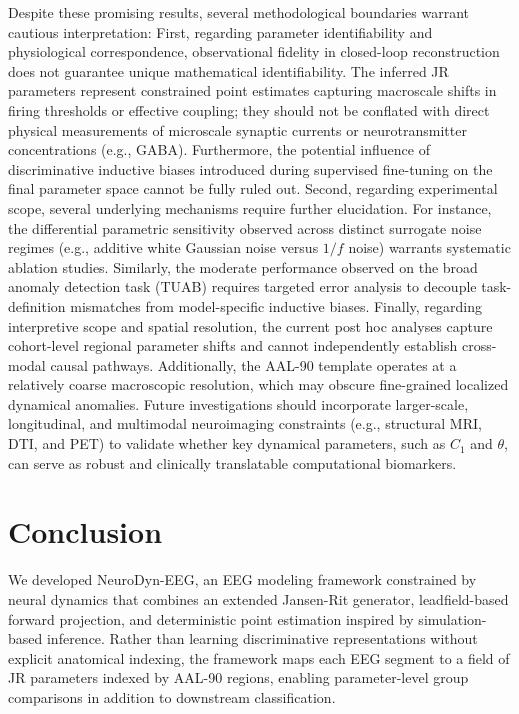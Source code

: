 \documentclass{article}
\begin{document}
{Despite these promising results, several methodological boundaries warrant cautious interpretation: First, regarding parameter identifiability and physiological correspondence, observational fidelity in closed-loop reconstruction does not guarantee unique mathematical identifiability. The inferred JR parameters represent constrained point estimates capturing macroscale shifts in firing thresholds or effective coupling; they should not be conflated with direct physical measurements of microscale synaptic currents or neurotransmitter concentrations (e.g., GABA). Furthermore, the potential influence of discriminative inductive biases introduced during supervised fine-tuning on the final parameter space cannot be fully ruled out. Second, regarding experimental scope, several underlying mechanisms require further elucidation. For instance, the differential parametric sensitivity observed across distinct surrogate noise regimes (e.g., additive white Gaussian noise versus $1/f$ noise) warrants systematic ablation studies. Similarly, the moderate performance observed on the broad anomaly detection task (TUAB) requires targeted error analysis to decouple task-definition mismatches from model-specific inductive biases. Finally, regarding interpretive scope and spatial resolution, the current post hoc analyses capture cohort-level regional parameter shifts and cannot independently establish cross-modal causal pathways. Additionally, the AAL-90 template operates at a relatively coarse macroscopic resolution, which may obscure fine-grained localized dynamical anomalies. Future investigations should incorporate larger-scale, longitudinal, and multimodal neuroimaging constraints (e.g., structural MRI, DTI, and PET) to validate whether key dynamical parameters, such as \texttt{$C_1$} and \texttt{$\theta$}, can serve as robust and clinically translatable computational biomarkers.

\section{Conclusion}
\label{sec:conclusion}
We developed NeuroDyn-EEG, an EEG modeling framework constrained by neural dynamics that combines an extended Jansen-Rit generator, leadfield-based forward projection, and deterministic point estimation inspired by simulation-based inference. Rather than learning discriminative representations without explicit anatomical indexing, the framework maps each EEG segment to a field of JR parameters indexed by AAL-90 regions, enabling parameter-level group comparisons in addition to downstream classification.

}
\end{document}
